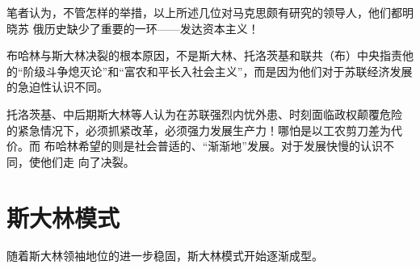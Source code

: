 笔者认为，不管怎样的举措，以上所述几位对马克思颇有研究的领导人，他们都明晓苏
俄历史缺少了重要的一环——发达资本主义！

布哈林与斯大林决裂的根本原因，不是斯大林、托洛茨基和联共（布）中央指责他
的“阶级斗争熄灭论”和“富农和平长入社会主义”，而是因为他们对于苏联经济发展
的急迫性认识不同。

托洛茨基、中后期斯大林等人认为在苏联强烈内忧外患、时刻面临政权颠覆危险
的紧急情况下，必须抓紧改革，必须强力发展生产力！哪怕是以工农剪刀差为代价。而
布哈林希望的则是社会普适的、“渐渐地”发展。对于发展快慢的认识不同，使他们走
向了决裂。

\section{斯大林模式}

随着斯大林领袖地位的进一步稳固，斯大林模式开始逐渐成型。

